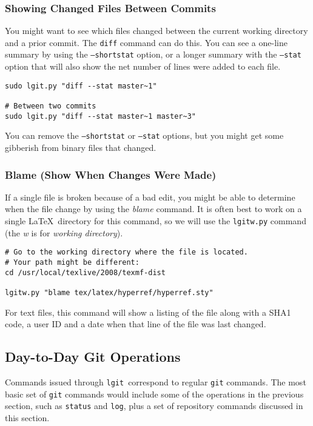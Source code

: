 \documentclass{ltxdoc}
\def\ucmd#1{{\tt {#1}}}
\def\lgit{{\tt lgit}}
\begin{document}
\subsubsection{Showing Changed Files Between Commits}
You might want to see which files changed between the current working directory and a prior commit.  The \ucmd{diff} command can do this. You can see a one-line summary by using the \ucmd{--shortstat} option, or a longer summary with the \ucmd{--stat} option that will also show the net number of lines were added to each file.
\begin{verbatim}
sudo lgit.py "diff --stat master~1"

# Between two commits
sudo lgit.py "diff --stat master~1 master~3"
\end{verbatim}
You can remove the \ucmd{--shortstat} or \ucmd{--stat} options, but you might get some gibberish from binary files that changed.

\subsubsection{Blame (Show When Changes Were Made)}
If a single file is broken because of a bad edit, you might be able to determine when the file change by using the \emph{blame} command.  It is often best to work on a single \LaTeX\ directory for this command, so we will use the \ucmd{lgitw.py} command (the \emph{w} is for \emph{working directory}).
\begin{verbatim}
# Go to the working directory where the file is located.
# Your path might be different:
cd /usr/local/texlive/2008/texmf-dist

lgitw.py "blame tex/latex/hyperref/hyperref.sty"
\end{verbatim}
For text files, this command will show a listing of the file along with a SHA1 code, a user ID and a date when that line of the file was last changed.

\subsubsection{}

\subsection{Day-to-Day Git Operations}
Commands issued through \lgit\ correspond to regular \ucmd{git} commands.  The most basic set of \ucmd{git} commands would include some of the operations in the previous section, such as \ucmd{status} and \ucmd{log}, plus a set of repository commands discussed in this section.
\end{document}
